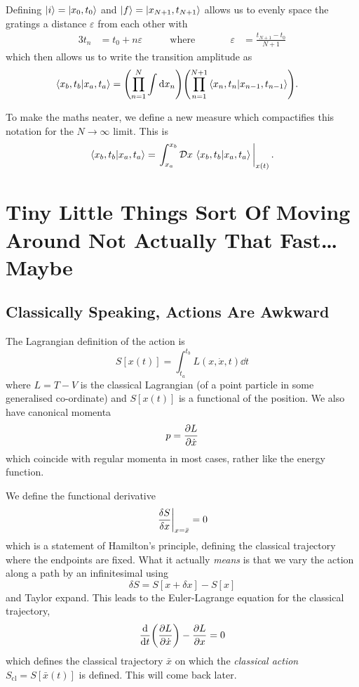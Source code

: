 \documentclass[]{revision-notes}
\begin{document}
Defining \(\ket{i} = \ket{x_0, t_0} \) and \( \ket{f} = \ket{x_{N+1}, t_{N+1}} \) allows us to evenly space the gratings a distance \( \varepsilon \) from each other with
\begin{alignat*}{3}
  t_n &= t_0 + n\varepsilon & \qquad \text{where}&\qquad& \varepsilon &= \frac{t_{N+1} - t_0}{N+1}
\end{alignat*}
which then allows us to write the transition amplitude as
\begin{align*}
  \braket{x_b, t_b}{x_a, t_a} &= \qty(\prod_{n=1}^{N}\int\dd{x_n})\qty(\prod_{n=1}^{N+1}\braket{x_{n}, t_{n}}{x_{n-1}, t_{n-1}}).
\end{align*}

To make the maths neater, we define a new measure which compactifies this notation for the \(N \to \infty \) limit.
This is \[ \braket{x_b, t_b}{x_a, t_a} =  \eval{\int_{x_a}^{x_b}\DD{x}\braket{x_b, t_b}{x_a, t_a}}_{x(t)}. \]

\chapter{Tiny Little Things Sort Of Moving Around Not Actually That Fast\ldots{} Maybe}
\section{Classically Speaking, Actions Are Awkward}
The Lagrangian definition of the action is \[ S[x(t)] = \int_{t_a}^{t_b} L(x, \dot{x}, t) \dd{t} \]
where \(L = T-V \) is the classical Lagrangian (of a point particle in some generalised co-ordinate) and \(S[x(t)]\) is a functional of the position. We also have canonical momenta \[ p = \pdv{L}{\dot{x}} \] which coincide with regular momenta in most cases, rather like the energy function.

We define the functional derivative
\[ \eval{\frac{\delta S}{\delta x}}_{x = \bar x} = 0 \] which is a statement of Hamilton's principle, defining the classical trajectory where the endpoints are fixed. What it actually \emph{means} is that we vary the action along a path by an infinitesimal using \[ \delta S = S[x + \delta x] - S[x] \] and Taylor expand. This leads to the Euler-Lagrange equation for the classical trajectory, \[ \dv{t}(\pdv{L}{\dot x}) - \pdv{L}{x} = 0 \] which defines the classical trajectory \(\bar{x} \) on which the \emph{classical action}
\(S_{\mathrm{cl}} = S[\bar x(t)]\) is defined. This will come back later.
\end{document}
